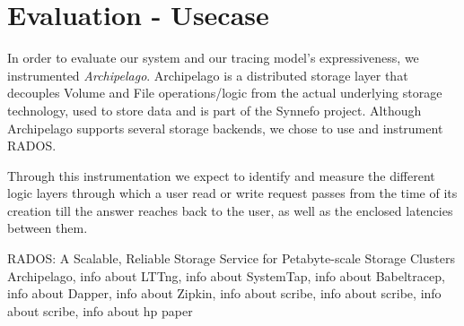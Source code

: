 \documentclass[a4paper,10pt,twocolumn]{article}
\begin{document}
\section{Evaluation - Usecase}

In order to evaluate our system and our tracing model's expressiveness, we 
instrumented \emph{Archipelago}\cite{archip}. Archipelago is a distributed 
storage layer that decouples Volume and File operations/logic from the actual
underlying storage technology, used to store data and is part of the Synnefo 
project\cite{synnefo}. Although Archipelago supports several storage backends,
we chose to use and instrument RADOS\cite{rados}. 

Through this instrumentation we expect to identify and measure the different 
logic layers through which a user read or write request passes from the time of
its creation till the answer reaches back to the user, as well as the enclosed 
latencies between them.

\begin{thebibliography}{9}
    RADOS: A Scalable, Reliable Storage Service for Petabyte-scale
    Storage Clusters
    Archipelago,
    info about
    LTTng,
    info about
    SystemTap,
    info about
    Babeltracep,
    info about
    Dapper,
    info about
    Zipkin,
   info about
    scribe,
   info about
    scribe,
   info about
    scribe,
   info about
    hp paper
\end{thebibliography}
\end{document}

